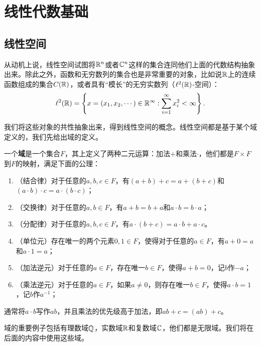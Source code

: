 \chapter{线性代数基础}\label{chap:linear-algebra}

\section{线性空间}

从动机上说，线性空间试图将$\mathbb{R}^n$或者$\mathbb{C}^n$这样的集合连同他们上面的代数结构抽象出来。除此之外，函数和无穷数列的集合也是非常重要的对象，比如说$\mathbb{R}$上的连续函数组成的集合$C(\mathbb{R})$，或者具有“模长”的无穷实数列（$\ell^2(\mathbb{R})$-空间）：
\[\ell^2(\mathbb{R})=\left\{x=(x_1,x_2,\cdots)\in\mathbb{R}^\infty:\sum_{i=1}^\infty x_i^2<\infty\right\}.\]

我们将这些对象的共性抽象出来，得到线性空间的概念。线性空间都是基于某个域定义的，我们先给出域的定义。

\begin{definition}[域]
一个\textbf{域}是一个集合$F$，其上定义了两种二元运算：加法$+$和乘法$\cdot$，他们都是$F\times F$到$F$的映射，满足下面的公理：
\begin{enumerate}
    \item （结合律）对于任意的$a,b,c\in F$，有$(a+b)+c=a+(b+c)$和$(a\cdot b)\cdot c=a\cdot (b\cdot c)$；
    \item （交换律）对于任意的$a,b\in F$，有$a+b=b+a$和$a\cdot b=b\cdot a$；
    \item（分配律）对于任意的$a,b,c\in F$，有$a\cdot(b+c)=a\cdot b+a\cdot c$。
    \item （单位元）存在唯一的两个元素$0,1\in F$，使得对于任意的$a\in F$，有$a+0=a$和$a\cdot 1=a$；
    \item （加法逆元）对于任意的$a\in F$，存在唯一$b\in F$，使得$a+b=0$，记$b$作$-a$；
    \item （乘法逆元）对于任意的$a\in F$，如果$a\neq 0$，则存在唯一$b\in F$，使得$a\cdot b=1$，记$b$作$a^{-1}$；
\end{enumerate}
通常将$a\cdot b$写作$ab$，并且乘法的优先级高于加法，即$ab+c=(ab)+c$。
\end{definition}

域的重要例子包括有理数域$\mathbb{Q}$，实数域$\mathbb{R}$和复数域$\mathbb{C}$，他们都是无限域。我们将在后面的内容中使用这些域。

